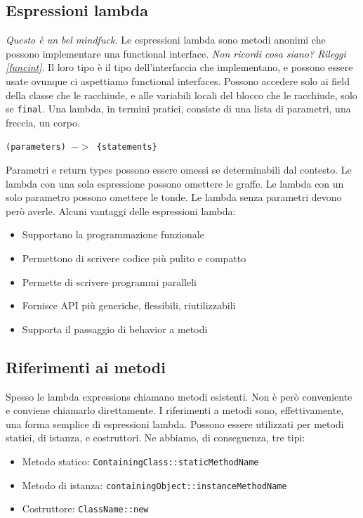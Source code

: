 \documentclass[11pt]{article}
\newcommand{\code}[1]{\texttt{#1}}
\begin{document}
\subsection{Espressioni lambda}
\textit{Questo è un bel mindfuck.} Le espressioni lambda sono metodi anonimi che possono implementare una functional interface. \textit{Non ricordi cosa siano? Rileggi \ref{funcint}}. Il loro tipo è il tipo dell'interfaccia che implementano, e possono essere usate ovunque ci aspettiamo functional interfaces. Possono accedere solo ai field della classe che le racchiude, e alle variabili locali del blocco che le racchiude, solo se \code{final}. Una lambda, in termini pratici, consiste di una lista di parametri, una freccia, un corpo.
\begin{center}
    \code{(parameters) $->$ \{statements\}}
\end{center}
Parametri e return types possono essere omessi se determinabili dal contesto.
Le lambda con una sola espressione possono omettere le graffe. Le lambda con un solo parametro possono omettere le tonde. Le lambda senza parametri devono però averle. 
Alcuni vantaggi delle espressioni lambda:
\begin{itemize}
    \item Supportano la programmazione funzionale 
    \item Permettono di scrivere codice più pulito e compatto 
    \item Permette di scrivere programmi paralleli
    \item Fornisce API più generiche, flessibili, riutilizzabili
    \item Supporta il passaggio di behavior a metodi
\end{itemize}
\subsection{Riferimenti ai metodi}
Spesso le lambda expressions chiamano metodi esistenti. Non è però conveniente e conviene chiamarlo direttamente. I riferimenti a metodi sono, effettivamente, una forma semplice di espressioni lambda. Possono essere utilizzati per metodi statici, di istanza, e costruttori. Ne abbiamo, di conseguenza, tre tipi:
\begin{itemize}
    \item Metodo statico: \code{ContainingClass::staticMethodName}
    \item Metodo di istanza: \code{containingObject::instanceMethodName}
    \item Costruttore: \code{ClassName::new}
\end{itemize}
\end{document}
